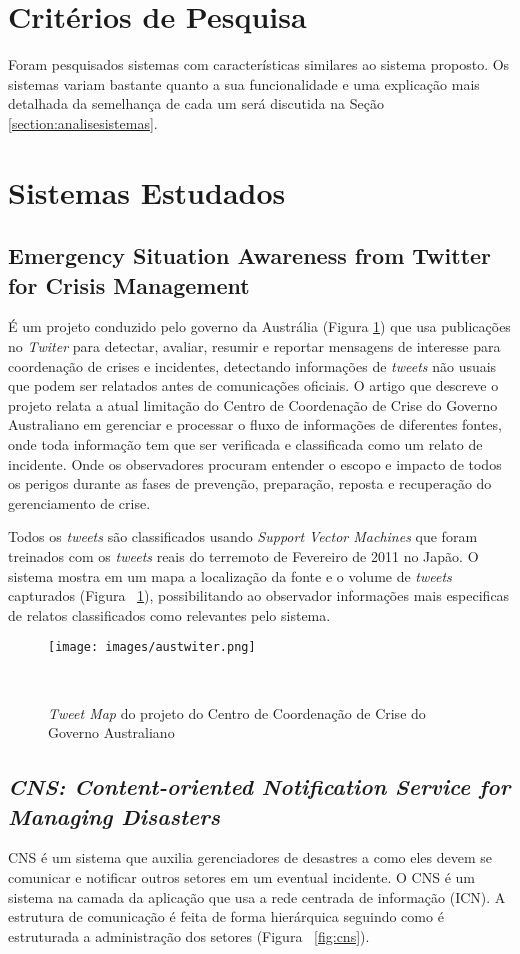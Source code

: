 \documentclass[	12pt, Times, openright, twoside, a4paper, english, brazil]{abntex2}
\begin{document}
\section{Critérios de Pesquisa}
Foram pesquisados sistemas com características similares ao sistema proposto. Os sistemas variam bastante quanto a sua funcionalidade e uma explicação mais detalhada da semelhança de cada um será discutida na Seção \ref{section:analisesistemas}.

\section{Sistemas Estudados}
\subsection{Emergency Situation Awareness from Twitter for Crisis Management}
\label{subsection:twitter}
É um projeto conduzido pelo governo da Austrália (Figura \ref{fig:austwiter}) que usa publicações no \textit{Twiter} para detectar, avaliar, resumir e reportar mensagens de interesse para coordenação de crises e incidentes, detectando informações de \textit{tweets} não usuais que podem ser relatados antes de comunicações oficiais. O artigo \cite{Cameron:2012:ESA:2187980.2188183} que descreve o projeto relata a atual limitação do Centro de Coordenação de Crise do Governo Australiano em gerenciar e processar o fluxo de informações de diferentes fontes, onde toda informação tem que ser verificada e classificada como um relato de incidente. Onde os observadores procuram entender o escopo e impacto de todos os perigos durante as fases de prevenção, preparação, reposta e recuperação do gerenciamento de crise.

Todos os \textit{tweets} são classificados usando \textit{Support Vector Machines} que foram treinados com os \textit{tweets} reais do terremoto de Fevereiro de 2011 no Japão. O sistema mostra em um mapa a localização da fonte e o volume de \textit{tweets} capturados (Figura ~\ref{fig:austwiter}), possibilitando ao observador informações mais especificas de relatos classificados como relevantes pelo sistema.

\begin{figure} [!h]
\centering
  \texttt{[image: images/austwiter.png]}
  \caption{\textit{Tweet Map} do projeto do Centro de Coordenação de Crise do Governo Australiano}~\label{fig:austwiter}
\end{figure}

\subsection{\textit{CNS: Content-oriented Notification Service for Managing Disasters}}
\label{subsection:cns}
CNS \cite{Chen:2016:CCN:2984356.2984368} é um sistema que auxilia gerenciadores de desastres a como eles devem se comunicar e notificar outros setores em um eventual incidente. O CNS é um sistema na camada da aplicação que usa a rede centrada de informação (ICN). A estrutura de comunicação é feita de forma hierárquica seguindo como é estruturada a administração dos setores (Figura ~\ref{fig:cns}). 
\end{document}
